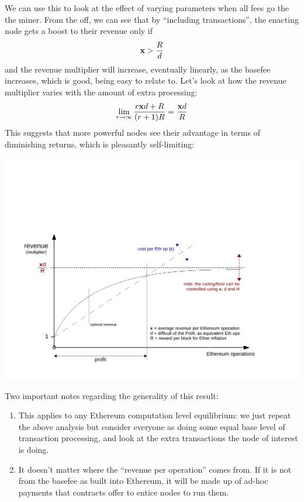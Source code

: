 \documentclass[10pt,a4paper]{article}
\begin{document}
We can use this to look at the effect of varying parameters when all fees go the the miner. From the off, we can see that by ``including transactions'', the enacting node gets a boost to their revenue only if 
\begin{align}
{\ensuremath{\mathbf x}} > \frac{R}{d}
\end{align}
and the revenue multiplier will increase, eventually linearly, as the basefee increases, which is good, being easy to relate to. Let's look at how the revenue multiplier varies with the amount of extra processing:
\begin{align}
\lim_{r\rightarrow\infty} \frac{r{\mathbf x} d + {R}}{(r+1){R}} = \frac{{\mathbf x} d}{{R}}
\end{align}
This suggests that more powerful nodes see their advantage in terms of diminishing returns, which is pleasantly self-limiting:

\begin{center}
\includegraphics[trim=1cm 1cm 1cm 6cm, clip, width=15cm]{CompPayoff.pdf}
\end{center}

Two important notes regarding the generality of this result:
\begin{enumerate} \itemsep=0pt
\item This applies to any Ethereum computation level equilibrium: we just repeat the above analysis but consider everyone as doing some equal base level of transaction processing, and look at the extra transactions the node of interest is doing.
\item It doesn't matter where the ``revenue per operation'' comes from. If it is not from the basefee as built into Ethereum, it will be made up of ad-hoc payments that contracts offer to entice nodes to run them.
\end{enumerate}
\end{document}
